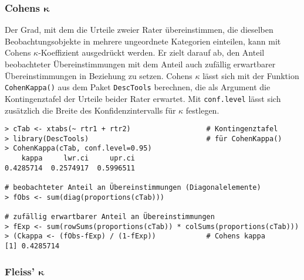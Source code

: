 \subsubsection[Cohens \texorpdfstring{$\kappa$}{kappa}]{Cohens $\bm{\kappa}$}

Der Grad, mit dem die Urteile zweier Rater übereinstimmen, die dieselben Beobachtungsobjekte in mehrere ungeordnete Kategorien einteilen, kann mit Cohens $\kappa$-Koeffizient ausgedrückt werden. Er zielt darauf ab, den Anteil beobachteter Übereinstimmungen mit dem Anteil auch zufällig erwartbarer Übereinstimmungen in Beziehung zu setzen. Cohens $\kappa$ lässt sich mit der Funktion \lstinline!CohenKappa()! aus dem Paket \lstinline!DescTools! berechnen, die als Argument die Kontingenztafel der Urteile beider Rater erwartet. Mit \lstinline!conf.level! lässt sich zusätzlich die Breite des Konfidenzintervalls für $\kappa$ festlegen.
\begin{lstlisting}
> cTab <- xtabs(~ rtr1 + rtr2)                  # Kontingenztafel
> library(DescTools)                            # für CohenKappa()
> CohenKappa(cTab, conf.level=0.95)
    kappa     lwr.ci     upr.ci
0.4285714  0.2574917  0.5996511

# beobachteter Anteil an Übereinstimmungen (Diagonalelemente)
> fObs <- sum(diag(proportions(cTab)))

# zufällig erwartbarer Anteil an Übereinstimmungen
> fExp <- sum(rowSums(proportions(cTab)) * colSums(proportions(cTab)))
> (Ckappa <- (fObs-fExp) / (1-fExp))            # Cohens kappa
[1] 0.4285714
\end{lstlisting}

\subsubsection[Fleiss' \texorpdfstring{$\kappa$}{kappa}]{Fleiss' $\bm{\kappa}$}
\label{sec:kappaFleiss}

